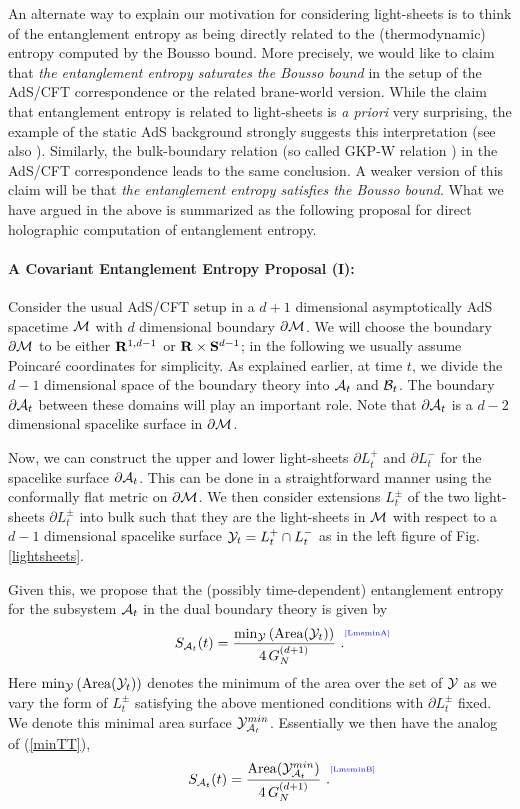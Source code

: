 \documentclass[12pt]{article}
\def\fig#1{Fig.\,\ref{#1}}
\def\req#1{(\ref{#1})}
\def\({\left (}
\def\){\right )}
\def\p{\partial}
\def\CA{{\cal A}}
\def\CB{{\cal B}}
\def\CY{{\cal Y}}
\def\R{{\bf R}}
\def\Sp{{\bf S}}
\def\p{\partial}
\def\p{\partial}
\def\Label#1{\label{#1}%
{ \color{blue}{\smash{\hbox to0pt{\raise2ex\hbox{\tiny[#1]}\hss}}}}}
\def\bulk{{\cal M}}
\def\bdy{\p{\cal M}}
\def\Lms{\CY}
\def\rA{\CA}
\def\rB{\CB}
\def\brA{\p \CA}
\def\area#1{{\rm Area}(#1)}
\def\de{\partial}
\begin{document}
An alternate way to explain our motivation for considering light-sheets
is to think of the entanglement entropy as being directly related to the
(thermodynamic) entropy computed by the Bousso bound. More precisely,
we would like to claim that {\it the entanglement entropy saturates the Bousso bound}
in the setup of the AdS/CFT correspondence or the related brane-world version.
 While the claim that entanglement entropy is related to light-sheets
is {\it a priori} very surprising, the example of the static AdS background strongly suggests  this interpretation (see also \cite{Hirata:2006jx}).
Similarly, the bulk-boundary relation (so called GKP-W relation
\cite{Gubser:1998bc, Witten:1998qj}) in the AdS/CFT correspondence
leads to the same conclusion. A weaker version of this claim will be
that {\it the entanglement entropy satisfies the Bousso bound}. What
we have argued in the above is summarized as the following proposal
for direct holographic computation of entanglement entropy.

\paragraph{A Covariant Entanglement Entropy Proposal (I):}
Consider the usual AdS/CFT setup in a $d+1$ dimensional
asymptotically AdS spacetime
 $\bulk$ with $d$ dimensional boundary $\bdy$. We will choose the boundary $\bdy$ to be either
   $\R^{1,d-1}$ or $\R\times \Sp^{d-1}$; in the following we usually assume Poincar\'e
    coordinates for  simplicity. As explained earlier, at time $t$, we divide the $d-1$
     dimensional space of the boundary theory into $\rA_t$ and $\rB_t$.
     The boundary $\brA_t$ between these
      domains will play an important role. Note that $\brA_t$ is a $d-2$
       dimensional spacelike surface in $\bdy$.

Now, we can construct the upper and lower light-sheets $\de L_t^{+}$
and $\de L_t^{-}$
 for the spacelike surface $\brA_t$.
 This can be done in a straightforward manner using the conformally flat
   metric on $\bdy$. We then consider extensions $L_t^{\pm}$ of the two light-sheets
   $\de L_t^{\pm}$ into bulk such that they are the light-sheets in $\bulk$ with respect
    to a $d-1$ dimensional spacelike surface $\Lms_t =L_t^{+}\cap L_t^{-}$
    as in the left figure of \fig{lightsheets}.

Given this, we propose that the (possibly time-dependent) entanglement
entropy for the subsystem $\rA_t$ in the
 dual boundary theory is given by
%
\begin{equation}
S_{\rA_t}(t)=\frac{\min_{\Lms} \(\area{\Lms_t} \)}{4\,
G^{(d+1)}_N} \ . \Label{LmsminA}
\end{equation}
%
Here $\min_{\Lms} \(\area{\Lms_t} \)$ denotes  the minimum of the
area over the set of $\Lms$ as we vary the form of $L_t^{\pm}$
satisfying the above mentioned conditions with $\de L_t^{\pm}$
fixed. We denote this minimal area surface $\Lms_{\rA_t}^{min}$.
Essentially we then have the analog of \req{minTT},
%
\begin{equation}
S_{\rA_t}(t) = \frac{\area{\Lms_{\rA_t}^{min}}}{ 4\, G^{(d+1)}_N} \ .
\Label{LmsminB}
\end{equation}
%
\end{document}
